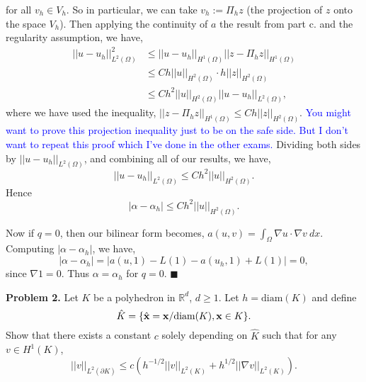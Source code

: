 \documentclass[11pt]{article}
\begin{document}
for all $v_h \in V_h$.
So in particular, we can take $v_h := \Pi_h z$ (the projection of $z$ onto the space $V_h$).
Then applying the continuity of $a$ the result from part c. and the regularity assumption, we have,
\begin{align*}
    ||u - u_h||^2_{L^2(\Omega)} &\leq ||u - u_h||_{H^1(\Omega)} ||z - \Pi_h z||_{H^1(\Omega)} \\
    &\leq Ch ||u||_{H^2(\Omega)} \cdot h ||z||_{H^2(\Omega)} \\
    &\leq Ch^2 ||u||_{H^2(\Omega)} ||u - u_h||_{L^2(\Omega)},
\end{align*}
where we have used the inequality, $||z - \Pi_h z||_{H^1(\Omega)} \leq Ch||z||_{H^2(\Omega)}$. \textcolor{blue}{You might want to prove this projection inequality just to be on the safe side. But I don't want to repeat this proof which I've done in the other exams.}
Dividing both sides by $||u - u_h||_{L^2(\Omega)}$, and combining all of our results, we have,
\begin{equation*}
    ||u - u_h||_{L^2(\Omega)} \leq Ch^2||u||_{H^2(\Omega)}.
\end{equation*}
Hence
\begin{equation*}
    |\alpha - \alpha_h| \leq Ch^2 ||u||_{H^2(\Omega)}.
\end{equation*}

Now if $q = 0$, then our bilinear form becomes, $a(u,v) = \int_\Omega \nabla u \cdot \nabla v \: dx$.
Computing $|\alpha - \alpha_h|$, we have,
\begin{equation*}
    |\alpha - \alpha_h| = |a(u,1) - L(1) - a(u_h,1) + L(1)| = 0,
\end{equation*}
since $\nabla 1 = 0$. 
Thus $\alpha = \alpha_h$ for $q = 0$.
$\blacksquare$




\vskip 2cm



{\bf Problem 2.} Let $K$ be a polyhedron in $\mathbb{R}^d$, $d\geq 1$. Let $h = \text{diam}(K)$ and define
\begin{equation}
\hat{K} = \{\hat{{\bf x}} = {\bf x}/\text{diam}(K), {\bf x}\in K \}. 
\end{equation}
Show that there exists a constant $c$ solely depending on $\hat{K}$ such that for any $v\in H^1(K)$,
\begin{equation}
    ||v||_{L^2(\partial K)} \leq c\left( h^{-1/2}||v||_{L^2(K)} + h^{1/2}||\nabla v||_{L^2(K)} \right). 
\end{equation}
\end{document}
